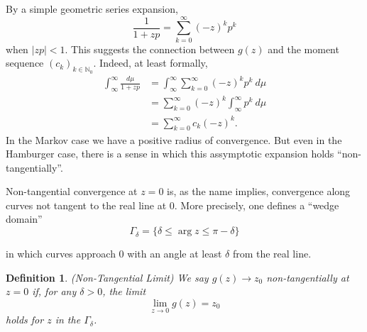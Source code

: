 \documentclass{amsart}
\newtheorem{definition}[theorem]{Definition}
\theoremstyle{remark}
\numberwithin{equation}{section}
\newcommand{\NN}{\mathbb{N}}
\begin{document}
By a simple geometric series expansion,
\[
    \frac1{1 + zp} = \sum_{k = 0}^\infty {(-z)}^k p^k 
\]
when $|zp| < 1$. This suggests the connection between $g(z)$ and the moment sequence ${(c_k)}_{k \in \NN_0}$. Indeed, at least formally,
\begin{align*}
    \int_\infty^\infty\frac{d\mu}{1+zp}
    &= \int_\infty^\infty \sum_{k = 0}^\infty {(-z)}^k p^k ~d\mu \\
    &= \sum_{k = 0}^\infty {(-z)}^k \int_\infty^\infty p^k ~d\mu \\
    &= \sum_{k = 0}^\infty c_k{(-z)}^k.
\end{align*}
In the Markov case we have a positive radius of convergence. But even in the Hamburger case, there is a sense in which this assymptotic expansion holds ``non-tangentially''.

Non-tangential convergence at $z = 0$ is, as the name implies, convergence along curves not tangent to the real line at $0$. More precisely, one defines a ``wedge domain''
\[
    \Gamma_\delta = \{\delta \leq \arg z \leq \pi - \delta\}
\]
\begin{figure}
\end{figure}
in which curves approach $0$ with an angle at least $\delta$ from the real line.

\begin{definition} (Non-Tangential Limit)
    We say $g(z) \rightarrow z_0$ non-tangentially at $z = 0$ if, for any $\delta > 0$, the limit 
    \[
        \lim_{z \rightarrow 0} g(z) = z_0
    \]
    holds for $z$ in the $\Gamma_\delta$.
\end{definition}
\end{document}
